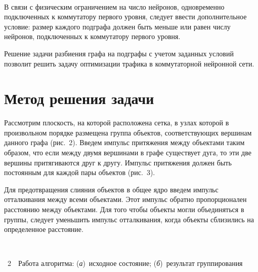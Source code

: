 \begin{multicols}{2}


\setcounter{figure}{2}
\begin{figure*} %
\vspace*{1pt}
\begin{center}
\mbox{%
\epsfxsize=126.93mm
}
\end{center}
\vspace*{-9pt}
\end{figure*}
     
     В связи с физическим ограничением на число нейронов, одновременно 
подключенных к коммутатору первого уровня, следует ввести 
дополнительное условие: размер каждого подграфа должен быть меньше или 
равен числу нейронов, подключенных к коммутатору первого уровня.
     
     Решение задачи разбиения графа на подграфы с учетом заданных 
условий позволит решить задачу оптимизации трафика в коммутаторной 
нейронной сети.

\vspace*{-6pt}

\section{Метод решения задачи}

\vspace*{-3pt}
     
     Рассмотрим плоскость, на которой расположена сетка, в узлах которой 
в произвольном порядке размещена группа объектов, соответствующих  
вершинам данного графа (рис.~2).  Введем импульс притяжения между объектами 
таким образом, что если между двумя вершинами в графе существует дуга, 
то эти две вершины притягиваются друг к другу. Импульс притяжения 
должен быть постоянным для каждой пары объектов (рис.~3). 
     
     Для предотвращения слияния объектов в общее ядро введем импульс 
отталкивания между всеми объектами. Этот импульс  обратно 
пропорционален расстоянию между объектами. Для того чтобы объекты 
могли объединяться в группы,  следует уменьшить импульс отталкивания,  
когда объекты сблизились на определенное расстояние.


\noindent
\begin{center} %
\vspace*{12pt}
\mbox{%
\epsfxsize=78.484mm
}
\end{center}
\vspace*{2pt}
{{\figurename~2}\ \ \small{Работа алгоритма: (\textit{а})~исходное состояние; (\textit{б})~результат 
группирования}}
\addtocounter{figure}{1}



\end{multicols}
